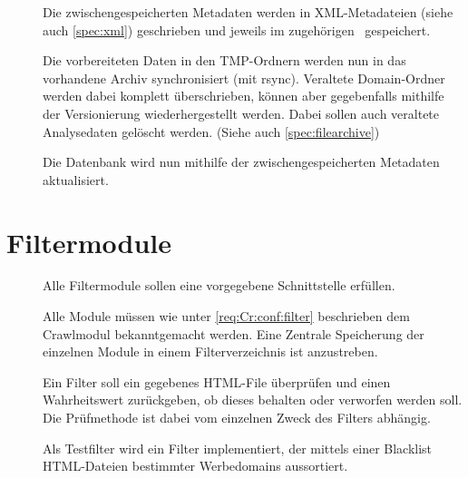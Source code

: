 \begin{description}
	\item []
		Die zwischengespeicherten Metadaten werden in XML-Metadateien (siehe auch \ref{spec:xml}) 
		geschrieben und jeweils im zugehörigen \htmlarc\ gespeichert. 
	\item []
		Die vorbereiteten Daten in den TMP-Ordnern werden nun in das vorhandene Archiv synchronisiert 
		(mit rsync). 
		Veraltete Domain-Ordner werden dabei komplett überschrieben, 
		können aber gegebenfalls mithilfe der Versionierung wiederhergestellt werden. 
		Dabei sollen auch veraltete Analysedaten gelöscht werden.
		(Siehe auch \ref{spec:filearchive})
	\item []
		Die Datenbank wird nun mithilfe der zwischengespeicherten Metadaten aktualisiert.
\end{description}

\section{Filtermodule}
\begin{description}
	\item []
		Alle Filtermodule sollen eine vorgegebene Schnittstelle erfüllen.
	\item []
		Alle Module müssen wie unter \ref{req:Cr:conf:filter} beschrieben dem Crawlmodul bekanntgemacht werden.
		Eine Zentrale Speicherung der einzelnen Module in einem Filterverzeichnis ist anzustreben.
	\item []
		Ein Filter soll ein gegebenes HTML-File überprüfen und einen Wahrheitswert zurückgeben,
		ob dieses behalten oder verworfen werden soll.
		Die Prüfmethode ist dabei vom einzelnen Zweck des Filters abhängig.
	\item []
		Als Testfilter wird ein Filter implementiert, 
		der mittels einer Blacklist HTML-Dateien bestimmter Werbedomains aussortiert.
\end{description}

